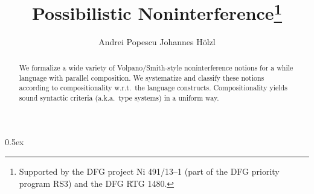 \documentclass[11pt,a4paper]{article}
\begin{document}
\title{Possibilistic Noninterference\thanks{Supported by the DFG project Ni 491/13--1 (part of the DFG priority program RS3) and the DFG RTG 1480.}
}
\author{Andrei Popescu \hspace*{10ex} Johannes H\"{o}lzl}

\maketitle

\begin{abstract}
We formalize a wide variety of Volpano/Smith-style 
noninterference notions for a while language with parallel composition.  
We systematize and classify these notions according to compositionality w.r.t.~the language constructs.  
Compositionality yields sound syntactic criteria (a.k.a.~type systems) in a uniform way.  
\end{abstract}


\tableofcontents

\parindent 0pt\parskip 0.5ex







\end{document}
